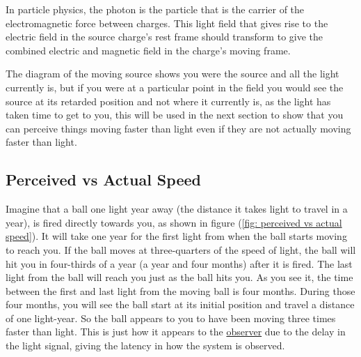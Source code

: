 In particle physics, the photon is the particle that is the carrier of the electromagnetic force between charges. This light field that gives rise to the electric field in the source charge's rest frame should transform to give the combined electric and magnetic field in the charge's moving frame.

The diagram of the moving source shows you were the source and all the light currently is, but if you were at a particular point in the field you would see the source at its retarded position and not where it currently is, as the light has taken time to get to you, this will be used in the next section to show that you can perceive things moving faster than light even if they are not actually moving faster than light.


\subsection{Perceived vs Actual Speed}

Imagine that a ball one light year away (the distance it takes light to travel in a year), is fired directly towards you, as shown in figure (\ref{fig: perceived vs actual speed}). It will take one year for the first light from when the ball starts moving to reach you. If the ball moves at three-quarters of the speed of light, the ball will hit you in four-thirds of a year (a year and four months) after it is fired. The last light from the ball will reach you just as the ball hits you. As you see it, the time between the first and last light from the moving ball is four months. During those four months, you will see the ball start at its initial position and travel a distance of one light-year. So the ball appears to you to have been moving three times faster than light. This is just how it appears to the \hyperlink{def-observer}{observer} due to the delay in the light signal, giving the latency in how the system is observed.

